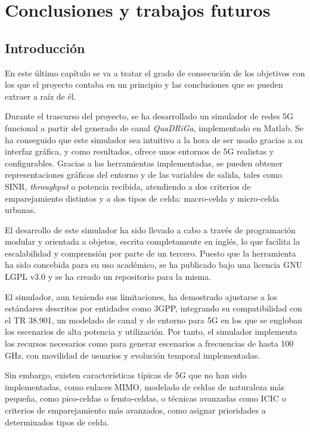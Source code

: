 \chapter{Conclusiones y trabajos futuros}\label{cap.conclusiones}
\section{Introducción}

En este último capítulo se va a tratar el grado de consecución de los objetivos con los que el proyecto contaba en un principio y las conclusiones que se pueden extraer a raíz de él. 

Durante el trascurso del proyecto, se ha desarrollado un simulador de redes 5G funcional a partir del generado de canal \textit{QuaDRiGa}, implementado en Matlab. Se ha conseguido que este simulador sea intuitivo a la hora de ser usado gracias a su interfaz gráfica, y como resultados, ofrece unos entornos de 5G realistas y configurables. Gracias a las herramientas implementadas, se pueden obtener representaciones gráficas del entorno y de las variables de salida, tales como SINR, \textit{throughput} o potencia recibida, atendiendo a dos criterios de emparejamiento distintos y a dos tipos de celda: macro-celda y micro-celda urbanas.

El desarrollo de este simulador ha sido llevado a cabo a través de programación modular y orientada a objetos, escrita completamente en inglés, lo que facilita la escalabilidad y comprensión por parte de un tercero. Puesto que la herramienta ha sido concebida para su uso académico, se ha publicado bajo una licencia GNU LGPL v3.0 y se ha creado un repositorio para la misma.

El simulador, aun teniendo sus limitaciones, ha demostrado ajustarse a los estándares descritos por entidades como 3GPP, integrando su compatibilidad con el TR 38.901, un modelado de canal y de entorno para 5G en los que se engloban los escenarios de alta potencia y utilización. Por tanto, el simulador implementa los recursos necesarios como para generar escenarios a frecuencias de hasta 100 GHz, con movilidad de usuarios y evolución temporal implementadas.

Sin embargo, existen características típicas de 5G que no han sido implementadas, como enlaces MIMO, modelado de celdas de naturaleza más pequeña, como pico-celdas o femto-celdas, o técnicas avanzadas como ICIC o criterios de emparejamiento más avanzados, como asignar prioridades a determinados tipos de celda.

